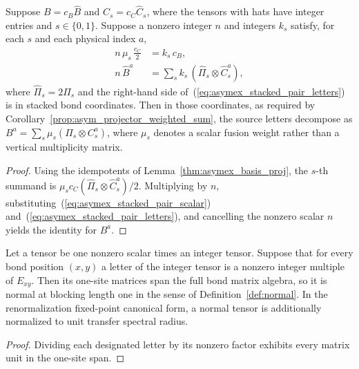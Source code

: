 \begin{lemma}
    \label{thm:asymex_stacked_pair}
    \leanok
    Suppose $B=c_B\widehat B$ and $C_s=c_C\widehat C_s$, where the
    tensors with hats have integer entries and $s\in\{0,1\}$.
    Suppose a nonzero integer $n$ and integers $k_s$ satisfy, for each
    $s$ and each physical index $a$,
    \begin{align}
        n\,\mu_s\,\frac{c_C}{2} & =k_s\,c_B,
        \label{eq:asymex_stacked_pair_scalar}
        \\
        n\,\widehat B^a         & =\sum_sk_s\,(\widehat\Pi_s\otimes\widehat C_s^a),
        \label{eq:asymex_stacked_pair_letters}
    \end{align}
    where $\widehat\Pi_s=2\Pi_s$ and the right-hand side
    of~(\ref{eq:asymex_stacked_pair_letters}) is in stacked bond
    coordinates. Then in those coordinates, as required by
    Corollary~\ref{prop:asym_projector_weighted_sum}, the source letters
    decompose as $B^a=\sum_s\mu_s(\Pi_s\otimes C_s^a)$, where $\mu_s$
    denotes a scalar fusion weight rather than a vertical multiplicity
    matrix.
\end{lemma}
\begin{proof}
    \leanok
    Using the idempotents of Lemma~\ref{thm:asymex_basis_proj}, the
    $s$-th summand is
    $\mu_sc_C(\widehat\Pi_s\otimes\widehat C_s^a)/2$.
    Multiplying by $n$, substituting~(\ref{eq:asymex_stacked_pair_scalar})
    and~(\ref{eq:asymex_stacked_pair_letters}), and cancelling the nonzero
    scalar $n$ yields the identity for $B^a$.
\end{proof}

\begin{lemma}
    \label{thm:asymex_normal_units}
    \leanok
    Let a tensor be one nonzero scalar times an integer tensor. Suppose
    that for every bond position $(x,y)$ a letter of the integer tensor
    is a nonzero integer multiple of $E_{xy}$. Then its one-site
    matrices span the full bond matrix algebra, so it is normal at
    blocking length one in the sense of Definition~\ref{def:normal}.
    In the renormalization fixed-point canonical form, a normal tensor is
    additionally normalized to unit transfer spectral radius.
\end{lemma}
\begin{proof}
    \leanok
    Dividing each designated letter by its nonzero factor exhibits every
    matrix unit in the one-site span.
\end{proof}

